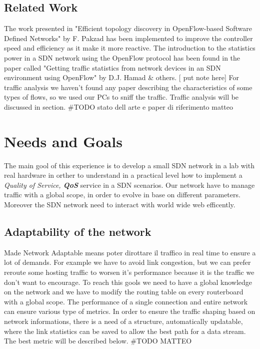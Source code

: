 \documentclass[conference,10pt]{IEEEtran}
\begin{document}
\subsection{Related Work}
  The work presented in 
"Efficient topology discovery in OpenFlow-based Software Defined Networks" by F. Pakzad \cite{farzaneh} 
has been implemented to improve the controller speed and efficiency as it make it more reactive.
The introduction to the statistics power in a SDN network using the OpenFlow protocol has been found 
in the paper called "Getting traffic statistics from network devices in an SDN environment using OpenFlow" by D.J. Hamad \& others. [ put note here]
For traffic analysis we haven't found any paper describing the characteristics of
some types of flows, so we used our PCs to sniff the traffic. Traffic analysis will be discussed in section.
  \#TODO stato dell arte e paper di riferimento  matteo

\section{Needs and Goals}\label{sec:obb} %
The main gool of this experience is to develop a small SDN network in a lab with real hardware
in orther to understand in a practical level how to implement a \textit{Quality of Service, \textbf{QoS}} service in a SDN scenarios.
Our network have to manage traffic with a global scope, in order to evolve in base on different parameters.
Moreover the SDN network need to interact with world wide web efficently.
  \subsection{Adaptability of the network}
  Made Network Adaptable means poter dirottare il traffico in real time to ensure a lot of demands. For example we have to avoid link congestion,
  but we can prefer reroute some hosting traffic to worsen it's performance because  it is the traffic we don't want to encourage.
  To reach this gools we need to have a global knowledge on the network and we have to modify the routing table on every routerboard with a
  global scope.
  The performance of a single connection and entire network can ensure various type of metrics.
  In order to ensure the traffic shaping based on network informations, there is a need of a structure, 
  automatically updatable, where the link statistics can be saved to allow the best path for a data stream. The best metric will be described below.
  \#TODO MATTEO
\end{document}
